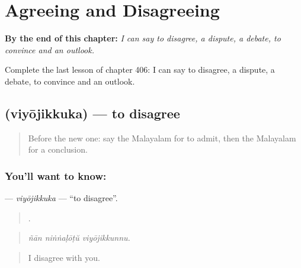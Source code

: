 
\chapter{Agreeing and Disagreeing}
\label{ch:ml-agreeing-and-disagreeing}

\begin{chapteropening}
\textbf{By the end of this chapter:} \emph{I can say to disagree, a dispute, a debate, to convince and an outlook.}

Complete the last lesson of chapter 406: I can say to disagree, a dispute, a debate, to convince and an outlook.
\end{chapteropening}

\section[\texorpdfstring{\ml{വിയോജിക്കുക} (viyōjikkuka)}{വിയോജിക്കുക (viyōjikkuka)}]{ (viyōjikkuka) — to disagree}

\label{lesson:ML-C406-viyojikkuka}



\begin{quote}
Before the new one: say the Malayalam for to admit, then the Malayalam for a conclusion.
\end{quote}

\subsection*{You'll want to know: }
\textbf{} — \emph{viyōjikkuka} — \textquotedblleft{}to disagree\textquotedblright{}.

\begin{quote}
  .
\end{quote}

\begin{quote}
\emph{ñān niṅṅaḷōṭŭ viyōjikkunnu.}
\end{quote}

\begin{quote}
I disagree with you.
\end{quote}

